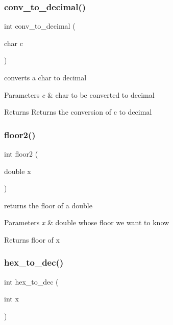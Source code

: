 \subsubsection{\texorpdfstring{conv\+\_\+to\+\_\+decimal()}{conv\_to\_decimal()}}
{\footnotesize\ttfamily int conv\+\_\+to\+\_\+decimal (\begin{DoxyParamCaption}\item[{char}]{c }\end{DoxyParamCaption})}



converts a char to decimal 


\begin{DoxyParams}{Parameters}
{\em c} & char to be converted to decimal \\
\hline
\end{DoxyParams}
\begin{DoxyReturn}{Returns}
Returns the conversion of c to decimal 
\end{DoxyReturn}
\hypertarget{group__utilities_ga529fd7b4e2b2f87cec4a30c191673207}{}\label{group__utilities_ga529fd7b4e2b2f87cec4a30c191673207} 
\subsubsection{\texorpdfstring{floor2()}{floor2()}}
{\footnotesize\ttfamily int floor2 (\begin{DoxyParamCaption}\item[{double}]{x }\end{DoxyParamCaption})}



returns the floor of a double 


\begin{DoxyParams}{Parameters}
{\em x} & double whose floor we want to know \\
\hline
\end{DoxyParams}
\begin{DoxyReturn}{Returns}
floor of x 
\end{DoxyReturn}
\hypertarget{group__utilities_gaa662bd9797d0cdd2707c9ad14849be44}{}\label{group__utilities_gaa662bd9797d0cdd2707c9ad14849be44} 
\subsubsection{\texorpdfstring{hex\+\_\+to\+\_\+dec()}{hex\_to\_dec()}}
{\footnotesize\ttfamily int hex\+\_\+to\+\_\+dec (\begin{DoxyParamCaption}\item[{int}]{x }\end{DoxyParamCaption})}



